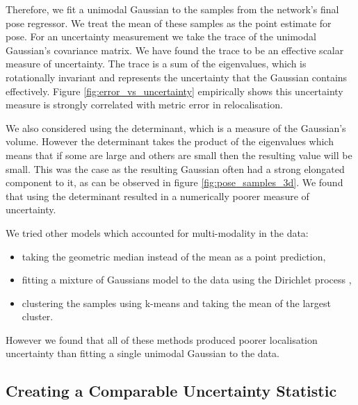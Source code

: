 Therefore, we fit a unimodal Gaussian to the samples from the network's final pose regressor. We treat the mean of these samples as the point estimate for pose. For an uncertainty measurement we take the trace of the unimodal Gaussian's covariance matrix. We have found the trace to be an effective scalar measure of uncertainty. The trace is a sum of the eigenvalues, which is rotationally invariant and represents the uncertainty that the Gaussian contains effectively. Figure \ref{fig:error_vs_uncertainty} empirically shows this uncertainty measure is strongly correlated with metric error in relocalisation.

We also considered using the determinant, which is a measure of the Gaussian's volume. However the determinant takes the product of the eigenvalues which means that if some are large and others are small then the resulting value will be small. This was  the case as the resulting Gaussian often had a strong elongated component to it, as can be observed in figure \ref{fig:pose_samples_3d}. We found that using the determinant resulted in a numerically poorer measure of uncertainty.

We tried other models which accounted for multi-modality in the data:
\begin{itemize}
\item taking the geometric median instead of the mean as a point prediction,
\item fitting a mixture of Gaussians model to the data using the Dirichlet process \citep{blei2006variational},
\item clustering the samples using k-means and taking the mean of the largest cluster.
\end{itemize}
However we found that all of these methods produced poorer localisation uncertainty than fitting a single unimodal Gaussian to the data.

\subsection{Creating a Comparable Uncertainty Statistic}
\label{ch:uncertainty_dist}

